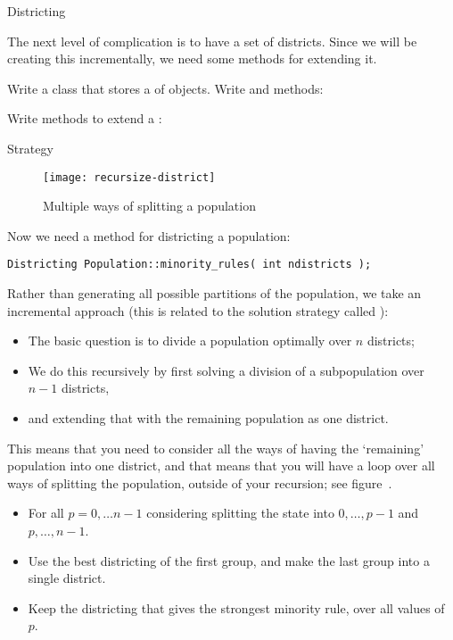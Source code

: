 {Districting}

The next level of complication is to have a set of districts.
Since we
will be creating this incrementally, we need some methods for
extending it.

\begin{exercise}
  Write a class  that stores a  of
   objects. Write  and  methods:
\end{exercise}

\begin{exercise}
  Write methods to extend a :
\end{exercise}

 {Strategy}

\begin{figure}[ht]
  \texttt{[image: recursize-district]}
  \caption{Multiple ways of splitting a population}
  \label{fig:recur-district}
\end{figure}

Now we need a method for districting a population:
\begin{lstlisting}
Districting Population::minority_rules( int ndistricts );
\end{lstlisting}
Rather than generating all possible partitions of the population, we
take an incremental approach (this is related to the solution strategy
called ):
\begin{itemize}
\item The basic question is to divide a population optimally over $n$
  districts;
\item We do this recursively by first solving a division of a subpopulation over $n-1$
  districts,
  \item and extending that with the remaining population as one district.
\end{itemize}
This means that you need to consider all the ways of having the
`remaining' population into one district, and that means that you will
have a loop over all ways of splitting the population, outside of your
recursion; see figure~.
\begin{itemize}
\item For all $p=0,\ldots n-1$ considering splitting the state into
  $0,\ldots,p-1$ and $p,\ldots,n-1$.
\item Use the best districting of the first group, and make the last
  group into a single district.
\item Keep the districting that gives the strongest minority rule,
  over all values of~$p$.
\end{itemize}

